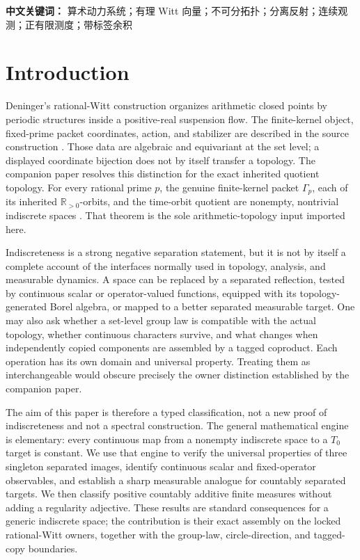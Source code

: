 \documentclass[11pt]{article}
\theoremstyle{definition}
\newcommand{\R}{\mathbb R}
\begin{document}
\medskip
\noindent\textbf{中文关键词：} 算术动力系统；有理 Witt 向量；不可分拓扑；分离反射；连续观测；正有限测度；带标签余积

\tableofcontents

\section{Introduction}

Deninger's rational-Witt construction organizes arithmetic closed points by periodic structures inside a positive-real suspension flow.  The finite-kernel object, fixed-prime packet coordinates, action, and stabilizer are described in the source construction \cite[Eqs.~(35) and (38)--(39), arXiv-v4 physical pp.~32--33; Section~6 and Theorem~6.1, physical pp.~38--39]{Deninger2026}.  Those data are algebraic and equivariant at the set level; a displayed coordinate bijection does not by itself transfer a topology.  The companion paper resolves this distinction for the exact inherited quotient topology.  For every rational prime $p$, the genuine finite-kernel packet $\Gamma_p$, each of its inherited $\R_{>0}$-orbits, and the time-orbit quotient are nonempty, nontrivial indiscrete spaces \cite[Theorem~5.1 and Corollaries~5.2--5.4]{Wang2026Packet}.  That theorem is the sole arithmetic-topology input imported here.

Indiscreteness is a strong negative separation statement, but it is not by itself a complete account of the interfaces normally used in topology, analysis, and measurable dynamics.  A space can be replaced by a separated reflection, tested by continuous scalar or operator-valued functions, equipped with its topology-generated Borel algebra, or mapped to a better separated measurable target.  One may also ask whether a set-level group law is compatible with the actual topology, whether continuous characters survive, and what changes when independently copied components are assembled by a tagged coproduct.  Each operation has its own domain and universal property.  Treating them as interchangeable would obscure precisely the owner distinction established by the companion paper.

The aim of this paper is therefore a typed classification, not a new proof of indiscreteness and not a spectral construction.  The general mathematical engine is elementary: every continuous map from a nonempty indiscrete space to a $T_0$ target is constant.  We use that engine to verify the universal properties of three singleton separated images, identify continuous scalar and fixed-operator observables, and establish a sharp measurable analogue for countably separated targets.  We then classify positive countably additive finite measures without adding a regularity adjective.  These results are standard consequences for a generic indiscrete space; the contribution is their exact assembly on the locked rational-Witt owners, together with the group-law, circle-direction, and tagged-copy boundaries.
\end{document}
